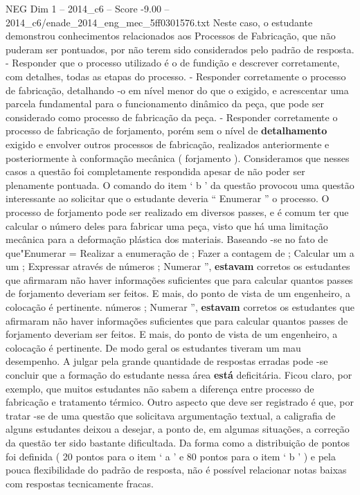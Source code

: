 \begin{textsample}{NEG Dim 1 – 2014\_c6 – Score -9.00 – 2014\_c6/enade\_2014\_eng\_mec\_5ff0301576.txt}
Neste caso, o estudante demonstrou conhecimentos relacionados aos Processos de Fabricação, que não puderam ser pontuados, por não terem sido considerados pelo padrão de resposta. - Responder que o processo utilizado é o de fundição e descrever corretamente, com detalhes, todas as etapas do processo. - Responder corretamente o processo de fabricação, detalhando -o em nível menor do que o exigido, e acrescentar uma parcela fundamental para o funcionamento dinâmico da peça, que pode ser considerado como processo de fabricação da peça. - Responder corretamente o processo de fabricação de forjamento, porém sem o nível de \textbf{detalhamento} exigido e envolver outros processos de fabricação, realizados anteriormente e posteriormente à conformação mecânica ( forjamento ).
Consideramos que nesses casos a questão foi completamente respondida apesar de não poder ser plenamente pontuada.
O comando do item ‘ b ’ da questão provocou uma questão interessante ao solicitar que o estudante deveria “ Enumerar ” o processo.
O processo de forjamento pode ser realizado em diversos passes, e é comum ter que calcular o número deles para fabricar uma peça, visto que há uma limitação mecânica para a deformação plástica dos materiais.
Baseando -se no fato de que"Enumerar = Realizar a enumeração de ; Fazer a contagem de ; Calcular um a um ; Expressar através de números ; Numerar ”, \textbf{estavam} corretos os estudantes que afirmaram não haver informações suficientes que para calcular quantos passes de forjamento deveriam ser feitos.
E mais, do ponto de vista de um engenheiro, a colocação é pertinente. números ; Numerar ”, \textbf{estavam} corretos os estudantes que afirmaram não haver informações suficientes que para calcular quantos passes de forjamento deveriam ser feitos.
E mais, do ponto de vista de um engenheiro, a colocação é pertinente.
De modo geral os estudantes tiveram um mau desempenho.
A julgar pela grande quantidade de respostas erradas pode -se concluir que a formação do estudante nessa área \textbf{está} deficitária.
Ficou claro, por exemplo, que muitos estudantes não sabem a diferença entre processo de fabricação e tratamento térmico.
Outro aspecto que deve ser registrado é que, por tratar -se de uma questão que solicitava argumentação textual, a caligrafia de alguns estudantes deixou a desejar, a ponto de, em algumas situações, a correção da questão ter sido bastante dificultada.
Da forma como a distribuição de pontos foi definida ( 20 pontos para o item ‘ a ’ e 80 pontos para o item ‘ b ’ ) e pela pouca flexibilidade do padrão de resposta, não é possível relacionar notas baixas com respostas tecnicamente fracas.

\end{textsample}
